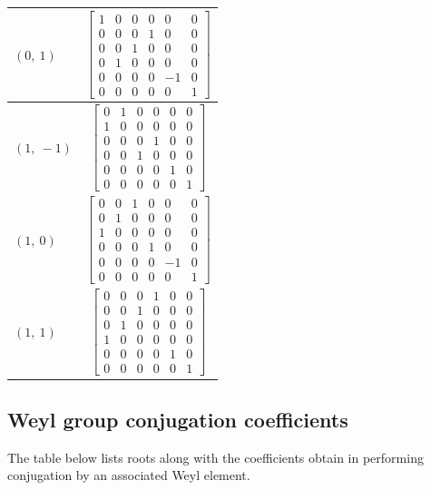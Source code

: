 \documentclass[11pt]{article}
\theoremstyle{definition}
\begin{document}
\begin{longtable}{|l|c|}
    \hline
    $\left( 0, \  1\right)$ & ${\left[\begin{matrix}1 & 0 & 0 & 0 & 0 & 0\\0 & 0 & 0 & 1 & 0 & 0\\0 & 0 & 1 & 0 & 0 & 0\\0 & 1 & 0 & 0 & 0 & 0\\0 & 0 & 0 & 0 & -1 & 0\\0 & 0 & 0 & 0 & 0 & 1\end{matrix}\right]}$ \\
    \hline
    $\left( 1, \  -1\right)$ & ${\left[\begin{matrix}0 & 1 & 0 & 0 & 0 & 0\\1 & 0 & 0 & 0 & 0 & 0\\0 & 0 & 0 & 1 & 0 & 0\\0 & 0 & 1 & 0 & 0 & 0\\0 & 0 & 0 & 0 & 1 & 0\\0 & 0 & 0 & 0 & 0 & 1\end{matrix}\right]}$ \\
    \hline
    $\left( 1, \  0\right)$ & ${\left[\begin{matrix}0 & 0 & 1 & 0 & 0 & 0\\0 & 1 & 0 & 0 & 0 & 0\\1 & 0 & 0 & 0 & 0 & 0\\0 & 0 & 0 & 1 & 0 & 0\\0 & 0 & 0 & 0 & -1 & 0\\0 & 0 & 0 & 0 & 0 & 1\end{matrix}\right]}$ \\
    \hline
    $\left( 1, \  1\right)$ & ${\left[\begin{matrix}0 & 0 & 0 & 1 & 0 & 0\\0 & 0 & 1 & 0 & 0 & 0\\0 & 1 & 0 & 0 & 0 & 0\\1 & 0 & 0 & 0 & 0 & 0\\0 & 0 & 0 & 0 & 1 & 0\\0 & 0 & 0 & 0 & 0 & 1\end{matrix}\right]}$ \\
    \hline
\end{longtable}


\subsection{Weyl group conjugation coefficients}

The table below lists roots along with the coefficients obtain in performing conjugation by an associated Weyl element.
\end{document}
